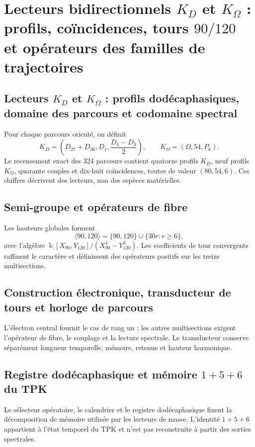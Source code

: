 \chapter{Lecteurs bidirectionnels \texorpdfstring{\(K_D\)}{K(D)} et \texorpdfstring{\(K_\Omega\)}{K(Omega)} : profils, coïncidences, tours \texorpdfstring{\(90/120\)}{90/120} et opérateurs des familles de trajectoires}
\label{chap:lectores-bidireccionales-torres-operadores}

\section{Lecteurs \(K_D\) et \(K_\Omega\) : profils dodécaphasiques, domaine des parcours et codomaine spectral}
Pour chaque parcours orienté, on définit
\[
 K_D=\left(D_{27}+D_{36},D_1,\frac{D_4-D_3}{2}\right),
 \qquad K_\Omega=(\Omega,54,P_6).
\]
Le recensement exact des 324 parcours contient quatorze profils \(K_D\), neuf profils \(K_\Omega\), quarante couples et dix-huit coïncidences, toutes de valeur \((80,54,6)\). Ces chiffres décrivent des lecteurs, non des espèces matérielles.

\section{Semi-groupe et opérateurs de fibre}
Les hauteurs globales forment
\[
 \langle90,120\rangle=\{90,120\}\cup\{30r:r\ge6\},
\]
avec l’algèbre \(\Bbbk[X_{90},Y_{120}]/(X_{90}^4-Y_{120}^3)\). Les coefficients de tour convergents raffinent le caractère et définissent des opérateurs positifs sur les treize multisections.

\section{Construction électronique, transducteur de tours et horloge de parcours}
L’électron central fournit le cas de rang un ; les autres multisections exigent l’opérateur de fibre, le couplage et la lecture spectrale. Le transducteur conserve séparément longueur temporelle, mémoire, retenue et hauteur harmonique.

\section{Registre dodécaphasique et mémoire \texorpdfstring{\(1+5+6\)}{1+5+6} du TPK}

Le sélecteur opératoire, le calendrier et le registre dodécaphasique fixent la décomposition de mémoire utilisée par les lecteurs de masse. L’identité \(1+5+6\) appartient à l’état temporel du TPK et n’est pas reconstruite à partir des sorties spectrales.

